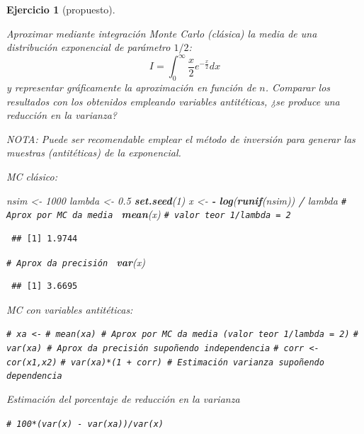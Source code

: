 \documentclass[
  spanish,
  10pt,
]{book}
\newenvironment{Shaded}{\begin{snugshade}}{\end{snugshade}}
\newcommand{\CommentTok}[1]{\textcolor[rgb]{0.56,0.35,0.01}{\textit{#1}}}
\newcommand{\DecValTok}[1]{\textcolor[rgb]{0.00,0.00,0.81}{#1}}
\newcommand{\FloatTok}[1]{\textcolor[rgb]{0.00,0.00,0.81}{#1}}
\newcommand{\FunctionTok}[1]{\textcolor[rgb]{0.13,0.29,0.53}{\textbf{#1}}}
\newcommand{\NormalTok}[1]{#1}
\newcommand{\OtherTok}[1]{\textcolor[rgb]{0.56,0.35,0.01}{#1}}
\newcommand{\SpecialCharTok}[1]{\textcolor[rgb]{0.81,0.36,0.00}{\textbf{#1}}}
\theoremstyle{break}
\newtheorem{exercise}{Ejercicio}[chapter]
\theoremstyle{nonumberplain}
\renewcommand{\CommentTok}[1]{\textcolor[rgb]{0.41,0.41,0.41}{\texttt{#1}}}
\begin{document}
\begin{exercise}[propuesto]
\protect\hypertarget{exr:int-ainv}{}\label{exr:int-ainv}

Aproximar mediante integración Monte Carlo (clásica) la media de una distribución exponencial de parámetro \(1/2\):
\[I=\int_{0}^{\infty}\frac{x}{2}e^{-\frac{x}{2}}dx\]
y representar gráficamente la aproximación en función de \(n\).
Comparar los resultados con los obtenidos empleando variables antitéticas,
¿se produce una reducción en la varianza?

NOTA: Puede ser recomendable emplear el método de inversión para generar las muestras (antitéticas) de la exponencial.

MC clásico:

\begin{Shaded}
\begin{Highlighting}[]
\NormalTok{nsim }\OtherTok{\textless{}{-}} \DecValTok{1000}
\NormalTok{lambda }\OtherTok{\textless{}{-}} \FloatTok{0.5}
\FunctionTok{set.seed}\NormalTok{(}\DecValTok{1}\NormalTok{)}
\NormalTok{x }\OtherTok{\textless{}{-}} \SpecialCharTok{{-}} \FunctionTok{log}\NormalTok{(}\FunctionTok{runif}\NormalTok{(nsim)) }\SpecialCharTok{/}\NormalTok{ lambda}
\CommentTok{\# Aprox por MC da media }
\FunctionTok{mean}\NormalTok{(x) }\CommentTok{\# valor teor 1/lambda = 2}
\end{Highlighting}
\end{Shaded}

\begin{verbatim}
 ## [1] 1.9744
\end{verbatim}

\begin{Shaded}
\begin{Highlighting}[]
\CommentTok{\# Aprox da precisión }
\FunctionTok{var}\NormalTok{(x)  }
\end{Highlighting}
\end{Shaded}

\begin{verbatim}
 ## [1] 3.6695
\end{verbatim}

MC con variables antitéticas:

\begin{Shaded}
\begin{Highlighting}[]
\CommentTok{\# xa \textless{}{-}}
\CommentTok{\# mean(xa) \# Aprox por MC da media (valor teor 1/lambda = 2)}
\CommentTok{\# var(xa)  \# Aprox da precisión supoñendo independencia}
\CommentTok{\# corr \textless{}{-} cor(x1,x2)}
\CommentTok{\# var(xa)*(1 + corr) \# Estimación varianza supoñendo dependencia}
\end{Highlighting}
\end{Shaded}

Estimación del porcentaje de reducción en la varianza

\begin{Shaded}
\begin{Highlighting}[]
\CommentTok{\# 100*(var(x) {-} var(xa))/var(x)}
\end{Highlighting}
\end{Shaded}

\end{exercise}
\end{document}
